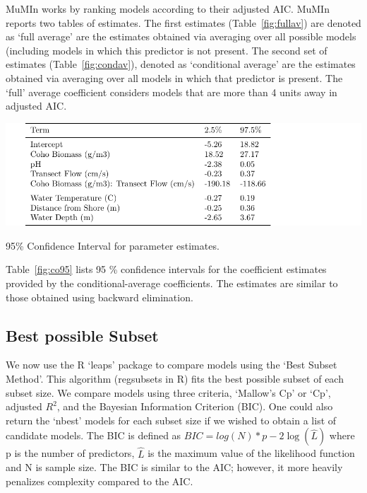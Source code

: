  MuMIn works by ranking models according to their adjusted AIC. MuMIn reports two tables of estimates. The first estimates (Table~\ref{fig:fullav}) are denoted as `full average' are the estimates obtained via averaging over all possible models (including models in which this predictor is not present. The second set of estimates (Table~\ref{fig:condav}), denoted as `conditional average' are the estimates obtained via averaging over all models in which that predictor is present. The `full' average coefficient considers models that are more than 4 units away in adjusted AIC. 

\vspace{5mm}


\begin{table}[H]
\includegraphics{Chapter5Images/95conf_coho.pdf}
\caption{95\% Confidence Interval for parameter estimates.}
\label{fig:co95}
\end{table}





Table~\ref{fig:co95} lists 95 \% confidence intervals for the coefficient estimates provided by the conditional-average coefficients. The estimates are similar to those obtained using backward elimination.





\newpage

\subsection{Best possible Subset}

We now use the R  `leaps' package \citep{leaps} to compare models using the `Best Subset Method'. This algorithm (regsubsets in R) fits the best possible subset of each subset size. We compare models using three criteria,  `Mallow's Cp' or `Cp', adjusted $R^{2}$, and the Bayesian Information Criterion (BIC).  One could also return the `nbest' models for each subset size if we wished to obtain a list of candidate models.  The BIC is defined as $BIC=log(N)*p-2\log(\hat L)$ where p is the number of predictors, $\hat{L}$ is the maximum value of the likelihood function and N is sample size. The BIC is similar to the AIC; however, it more heavily penalizes complexity compared to the AIC.

